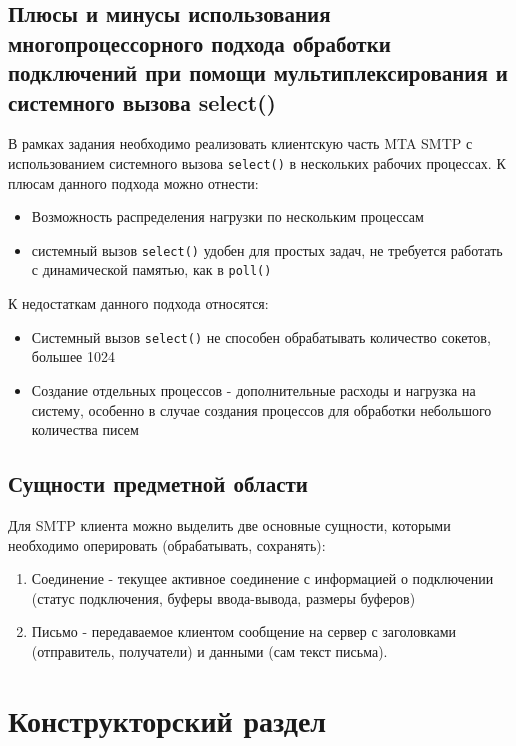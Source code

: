 \documentclass[a4paper,12pt]{report}
\begin{document}
\section{Плюсы и минусы использования многопроцессорного подхода обработки подключений при помощи мультиплексирования и системного вызова select()}

В рамках задания необходимо реализовать клиентскую часть MTA SMTP с использованием системного вызова \texttt{select()} в нескольких рабочих процессах. К плюсам данного подхода можно отнести:
\begin{itemize}
    \item Возможность распределения нагрузки по нескольким процессам
    \item системный вызов \texttt{select()} удобен для простых задач, не требуется работать с динамической памятью, как в  \texttt{poll()}
\end{itemize}

К недостаткам данного подхода относятся:
\begin{itemize}
    \item Системный вызов \texttt{select()} не способен обрабатывать количество сокетов, большее 1024
    \item Создание отдельных процессов - дополнительные расходы и нагрузка на систему, особенно в случае создания процессов для обработки небольшого количества писем
\end{itemize}


\section{Сущности предметной области}

Для SMTP клиента можно выделить две основные сущности, которыми необходимо оперировать (обрабатывать, сохранять):
\begin{enumerate}
    \item Соединение - текущее активное соединение с информацией о подключении (статус подключения, буферы ввода-вывода, размеры буферов)
    \item Письмо - передаваемое клиентом сообщение на сервер с заголовками (отправитель, получатели) и данными (сам текст письма).
\end{enumerate}


\chapter{Конструкторский раздел}
\end{document}
